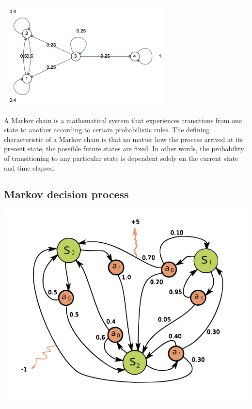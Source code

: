 \documentclass{article}
\begin{document}
\begin{center}
\includegraphics[scale=0.6]{./images/markov_chain_graph.png}
\end{center}

\noindent A Markov chain is a mathematical system that experiences transitions from one state to another according to certain probabilistic rules. The defining characteristic of a Markov chain is that no matter how the process arrived at its present state, the possible future states are fixed. In other words, the probability of transitioning to any particular state is dependent solely on the current state and time elapsed.

\subsection{Markov decision process}

\begin{center}
\includegraphics[scale=0.3]{./images/markov_decision_process.png}
\end{center}
\end{document}
